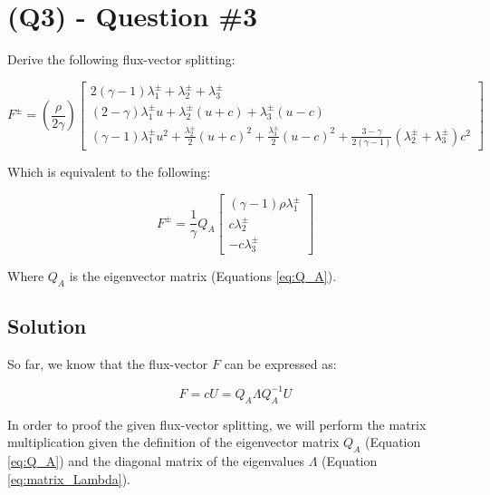\section{(Q3) - Question \#3}
\label{sec:Q3}

Derive the following flux-vector splitting:

\begin{equation}
    F^\pm = \left( \frac{\rho}{2\gamma} \right) \begin{bmatrix}
        2(\gamma - 1) \lambda_1^\pm + \lambda_2^\pm + \lambda_3^\pm                  \\
        (2 - \gamma) \lambda_1^\pm u + \lambda_2^\pm (u + c) + \lambda_3^\pm (u - c) \\
        (\gamma - 1) \lambda_1^\pm u^2 + \frac{\lambda_2^\pm}{2} (u + c)^2 + \frac{\lambda_3^\pm}{2} (u - c)^2 + \frac{3-\gamma}{2(\gamma - 1)} (\lambda_2^\pm + \lambda_3^\pm) c^2
    \end{bmatrix}
    \label{eq:flux_vector_splitting}
\end{equation}

Which is equivalent to the following:

\begin{equation}
    F^\pm = \frac{1}{\gamma} Q_A \begin{bmatrix}
        (\gamma - 1) \rho \lambda_1^\pm \\
        c \lambda_2^\pm                 \\
        -c \lambda_3^\pm
    \end{bmatrix}
\end{equation}

Where $Q_A$ is the eigenvector matrix (Equations \ref{eq:Q_A}).

\subsection{Solution}

So far, we know that the flux-vector $F$ can be expressed as:

\begin{equation}
    F = c U = Q_A \Lambda Q_A^{-1} U
\end{equation}

In order to proof the given flux-vector splitting, we will perform the matrix multiplication given the definition of the eigenvector matrix $Q_A$ (Equation \ref{eq:Q_A}) and the diagonal matrix of the eigenvalues $\Lambda$ (Equation \ref{eq:matrix_Lambda}).

